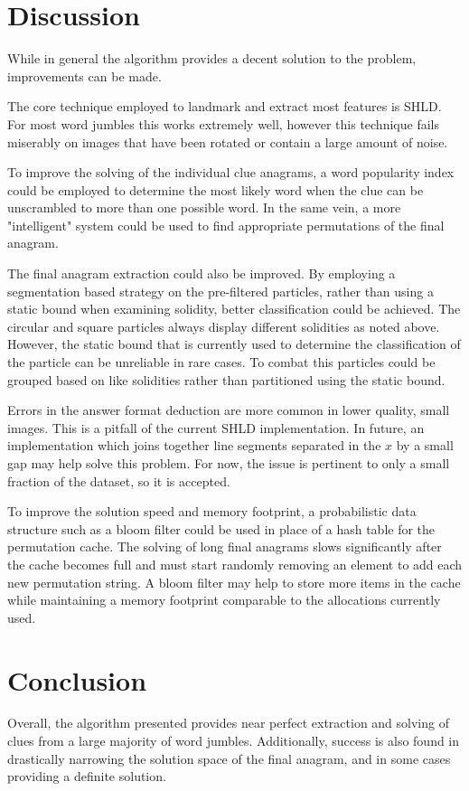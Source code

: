 \documentclass{article}
\begin{document}
	\section{Discussion}
	While in general the algorithm provides a decent solution to the problem, improvements can be made.  \par \hspace{10pt}
	The core technique employed to landmark and extract most features is SHLD.  For most word jumbles this works extremely well, however this technique fails miserably on images that have been rotated or contain a large amount of noise. \par\hspace{10pt}
	To improve the solving of the individual clue anagrams, a word popularity index could be employed to determine the most likely word when the clue can be unscrambled to more than one possible word. In the same vein, a more "intelligent" system could be used to find appropriate permutations of the final anagram. \par \hspace{10pt}
	The final anagram extraction could also be improved.  By employing a segmentation based strategy on the pre-filtered particles, rather than using a static bound when examining solidity, better classification could be achieved.  The circular and square particles always display different solidities as noted above.  However, the static bound that is currently used to determine the classification of the particle can be unreliable in rare cases. To combat this particles could be grouped based on like solidities rather than partitioned using the static bound. \par \hspace{10pt}
	Errors in the answer format deduction are more common in lower quality, small images.  This is a pitfall of the current SHLD implementation.  In future, an implementation which joins together line segments separated in the $x$ by a small gap may help solve this problem.  For now, the issue is pertinent to only a small fraction of the dataset, so it is accepted.\par \hspace{10pt}
	To improve the solution speed and memory footprint, a probabilistic data structure such as a bloom filter could be used in place of a hash table for the permutation cache.  The solving of long final anagrams slows significantly after the cache becomes full and must start randomly removing an element to add each new permutation string.  A bloom filter may help to store more items in the cache while maintaining a memory footprint comparable to the allocations currently used. \par 
	
	\section{Conclusion}
	Overall, the algorithm presented provides near perfect extraction and solving of clues from a large majority of word jumbles.  Additionally, success is also found in drastically narrowing the solution space of the final anagram, and in some cases providing a definite solution.

	
	
	
\end{document}
